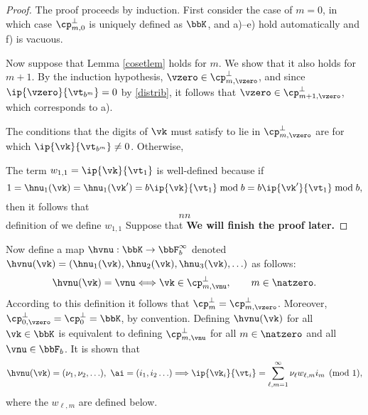 \documentclass[]{elsarticle}
\theoremstyle{definition}
\begin{document}
\begin{proof} The proof proceeds by induction.  First consider the case of $m=0$, in which case $\cp_{m,0}^{\perp}$ is uniquely defined as $\bbK$, and a)--e) hold automatically and f) is vacuous. 

Now suppose that Lemma \ref{cosetlem} holds for $m$.  We show that it also holds for $m+1$.  By the induction hypothesis, $\vzero \in \cp_{m,\vzero}^{\perp}$, and since $\ip{\vzero}{\vt_{b^{m}}}=0$ by \eqref{distrib}, it follows that $\vzero \in \cp_{m+1,\vzero}^{\perp}$, which corresponds to a).

The conditions that the digits of $\vk$ must satisfy to lie in $\cp_{m,\vzero}^{\perp}$ are  for which $\ip{\vk}{\vt_{b^{m}}}\ne 0$.  Otherwise,  












The term $w_{1,1} = \ip{\vk}{\vt_{1}}$ is well-defined because if 
\[
1=\hnu_1(\vk)=\hnu_1(\vk')=b \ip{\vk}{\vt_{1}} \bmod b = b \ip{\vk'}{\vt_{1}} \bmod b,
\]
then it follows that 
\[
nn
\]
 definition of  we define $w_{1,1}$ Suppose that 
{\bf We will finish the proof later.}
\end{proof}


Now define a map $\hvnu: \bbK \to \bbF_b^\infty$ denoted $\hvnu(\vk)=(\hnu_1(\vk), \hnu_2(\vk), \hnu_3(\vk), \ldots )$ as follows:
\[
\hvnu(\vk)=\vnu \Longleftrightarrow \vk \in \cp_{m,\vnu}^{\perp}, \qquad m \in \natzero.
\]
According to this definition it follows that $\cp_{m}^{\perp}=\cp_{m,\vzero}^{\perp}$.  Moreover, $\cp_{0,\vzero}^{\perp}=\cp_{0}^{\perp}=\bbK$, by convention.  Defining $\hvnu(\vk)$ for all $\vk \in \bbK$ is equivalent to defining $\cp_{m,\vnu}^{\perp}$ for all $m \in \natzero$ and all $\vnu \in \bbF_b$.  It is shown that
\begin{equation} \label{nuwisum}
\hvnu(\vk)=(\nu_1, \nu_2, \ldots),\  \ai=(i_1, i_2 \ldots) \Longrightarrow \ip{\vk_i}{\vt_i} = \sum_{\ell,m=1}^{\infty} \nu_\ell w_{\ell,m} i_m \pmod 1,
\end{equation}
where the $w_{\ell,m}$ are defined below.  
\end{document}
